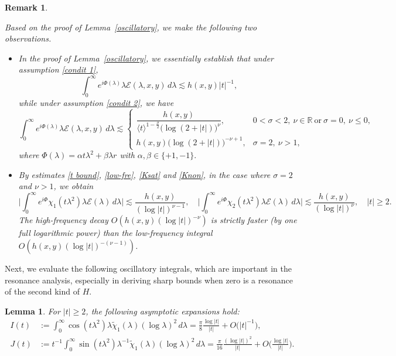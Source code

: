 \documentclass[reqno]{amsart}
\newtheorem{lemma}[theorem]{Lemma}
\newtheorem{remark}[theorem]{Remark}
\numberwithin{equation}{section}
\begin{document}
\begin{remark}\label{remark:osci} {\rm
	Based on the proof of Lemma~\ref{oscillatory}, we make the following two observations.
	\begin{itemize}
        \item[(i)] In the proof of Lemma~\ref{oscillatory}, we essentially establish that under assumption \eqref{condit 1},
\[
\int_{0}^{\infty} e^{i\Phi(\lambda)} \lambda \mathcal{E}(\lambda,x,y) \, d\lambda\lesssim h(x,y)|t|^{-1},
\]
while under assumption \eqref{condit 2}, we have
  \[
    \int_{0}^{\infty} e^{i\Phi(\lambda)} \lambda \mathcal{E}(\lambda,x,y) \, d\lambda \lesssim 
    \begin{cases}
        \dfrac{h(x,y)}{\langle t \rangle^{1-\frac{\sigma}{2}} \bigl(\log(2+|t|)\bigr)^{\nu}}, & 0 < \sigma < 2,\ \nu \in \mathbb{R}\ \text{or}\ \sigma = 0,\ \nu \le 0, \\[8pt]
h(x,y)\bigl(\log(2+|t|)\bigr)^{-\nu+1}, & \sigma = 2,\ \nu > 1,
    \end{cases}
    \]
   where $\Phi(\lambda)= \alpha t\lambda^2 + \beta \lambda r$ with  $\alpha, \beta \in \{+1, -1\}.$ 
   
        
    
        
        
        
		\item[(ii)] By estimates \eqref{t bound}, \eqref{low-fre}, \eqref{Ksat} and \eqref{Knon}, in the case where $\sigma = 2$ and $\nu > 1$, we obtain 
		\[
		\Big| \int_0^{\infty} e^{i\Phi} \chi_1(t\lambda^2) \lambda \mathcal{E}(\lambda) \, d\lambda \Big| \lesssim \frac{h(x,y)}{(\log |t|)^{\nu-1}}, \quad
		\Big| \int_0^{\infty} e^{i\Phi} \chi_2(t\lambda^2) \lambda \mathcal{E}(\lambda) \, d\lambda \Big| \lesssim \frac{h(x,y)}{(\log |t|)^{\nu}},\quad |t|\geq2.
		\]
		The high-frequency decay $O(h(x,y)(\log |t|)^{-\nu})$ is strictly faster (by one full logarithmic power) than the low-frequency integral $O(h(x,y)(\log |t|)^{-(\nu-1)})$.
	\end{itemize}}
\end{remark}
Next, we evaluate the following oscillatory integrals, which are important in the resonance analysis, especially in deriving sharp bounds when zero is a resonance of the second kind of $H$.
\begin{lemma}\label{lemma:I_J}    
	For $|t| \ge 2$, the following asymptotic expansions hold:    
	\[
    \begin{aligned}    
		I(t) &:= \int_0^\infty \cos(t\lambda^2) \lambda \widetilde{\chi}_1(\lambda) (\log \lambda)^2 \, d\lambda = \frac{\pi}{8} \frac{\log |t|}{|t|} + O\big(|t|^{-1}\big),  \\    
		J(t) &:= t^{-1} \int_0^\infty \sin(t\lambda^2) \lambda^{-1} \widetilde{\chi}_1(\lambda) (\log \lambda)^2 \, d\lambda = \frac{\pi}{16} \frac{(\log |t|)^2}{|t|} + O\Big(\frac{\log |t|}{|t|}\Big).    
	\end{aligned}
    \]
\end{lemma}    
\end{document}
